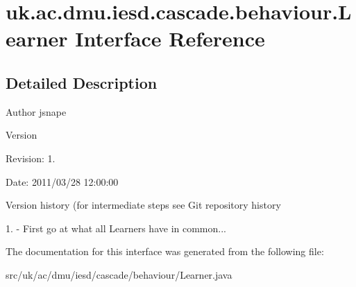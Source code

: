 \hypertarget{interfaceuk_1_1ac_1_1dmu_1_1iesd_1_1cascade_1_1behaviour_1_1_learner}{\section{uk.\-ac.\-dmu.\-iesd.\-cascade.\-behaviour.\-Learner Interface Reference}
\label{interfaceuk_1_1ac_1_1dmu_1_1iesd_1_1cascade_1_1behaviour_1_1_learner}
}


\subsection{Detailed Description}
\begin{DoxyAuthor}{Author}
jsnape 
\end{DoxyAuthor}
\begin{DoxyVersion}{Version}

\end{DoxyVersion}
\begin{DoxyParagraph}{Revision\-:}
1. 
\end{DoxyParagraph}
\begin{DoxyParagraph}{Date\-:}
2011/03/28 12\-:00\-:00 
\end{DoxyParagraph}


Version history (for intermediate steps see Git repository history

1. -\/ First go at what all Learners have in common... 

The documentation for this interface was generated from the following file\-:\begin{DoxyCompactItemize}
\item 
src/uk/ac/dmu/iesd/cascade/behaviour/Learner.\-java\end{DoxyCompactItemize}
